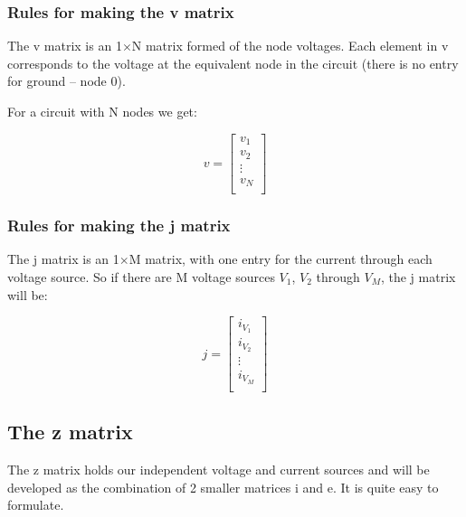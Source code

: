 \documentclass[10pt]{report}
\begin{document}
\subsubsection{Rules for making the v matrix}

The v matrix is an 1$\times$N matrix formed of the node voltages.
Each element in v corresponds to the voltage at the equivalent node in
the circuit (there is no entry for ground -- node 0).

\addvspace{12pt}

For a circuit with N nodes we get:

\begin{equation}
v =
\begin{bmatrix}
v_{1}\\
v_{2}\\
\vdots\\
v_{N}\\
\end{bmatrix}
\end{equation}

\subsubsection{Rules for making the j matrix}

The j matrix is an 1$\times$M matrix, with one entry for the current
through each voltage source.  So if there are M voltage sources
$V_{1}$, $V_{2}$ through $V_{M}$, the j matrix will be:

\begin{equation}
j =
\begin{bmatrix}
i_{V_{1}}\\
i_{V_{2}}\\
\vdots\\
i_{V_{M}}\\
\end{bmatrix}
\end{equation}

\subsection{The z matrix}

The z matrix holds our independent voltage and current sources and
will be developed as the combination of 2 smaller matrices i and e.
It is quite easy to formulate.
\end{document}
